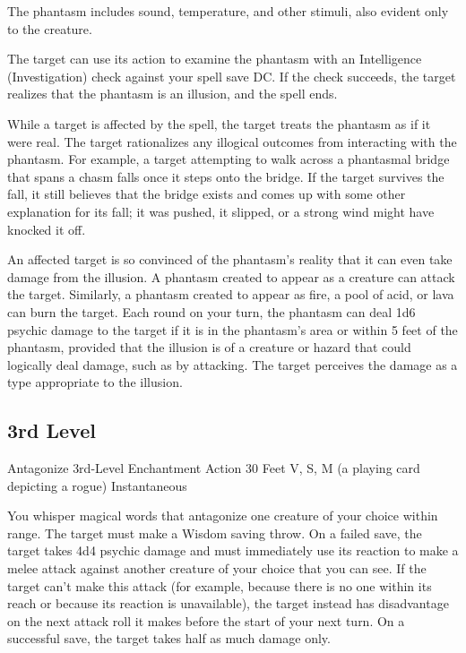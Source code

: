 \documentclass[letterpaper,openany,oneside,twocolumn]{book}
\begin{document}
The phantasm includes sound, temperature, and other stimuli, also evident only to the creature.

The target can use its action to examine the phantasm with an Intelligence (Investigation) check against your spell save DC. If the check succeeds, the target realizes that the phantasm is an illusion, and the spell ends.

While a target is affected by the spell, the target treats the phantasm as if it were real. The target rationalizes any illogical outcomes from interacting with the phantasm. For example, a target attempting to walk across a phantasmal bridge that spans a chasm falls once it steps onto the bridge. If the target survives the fall, it still believes that the bridge exists and comes up with some other explanation for its fall; it was pushed, it slipped, or a strong wind might have knocked it off.

An affected target is so convinced of the phantasm's reality that it can even take damage from the illusion. A phantasm created to appear as a creature can attack the target. Similarly, a phantasm created to appear as fire, a pool of acid, or lava can burn the target. Each round on your turn, the phantasm can deal 1d6 psychic damage to the target if it is in the phantasm's area or within 5 feet of the phantasm, provided that the illusion is of a creature or hazard that could logically deal damage, such as by attacking. The target perceives the damage as a type appropriate to the illusion.

\subsection*{3rd Level}

\DndSpellHeader
  {Antagonize}
  {3rd-Level Enchantment}
  {Action}
  {30 Feet}
  {V, S, M (a playing card depicting a rogue)}
  {Instantaneous}

You whisper magical words that antagonize one creature of your choice within range. The target must make a Wisdom saving throw. On a failed save, the target takes 4d4 psychic damage and must immediately use its reaction to make a melee attack against another creature of your choice that you can see. If the target can't make this attack (for example, because there is no one within its reach or because its reaction is unavailable), the target instead has disadvantage on the next attack roll it makes before the start of your next turn. On a successful save, the target takes half as much damage only.
\end{document}
